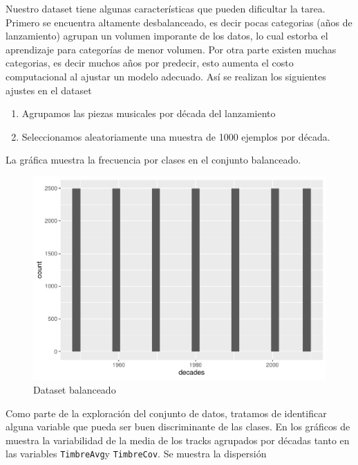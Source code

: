 \documentclass[conference,final,]{IEEEtran}
\providecommand{\tightlist}{%
  \setlength{\itemsep}{0pt}\setlength{\parskip}{0pt}}
\begin{document}
Nuestro dataset tiene algunas características que pueden dificultar la
tarea. Primero se encuentra altamente desbalanceado, es decir pocas
categorias (años de lanzamiento) agrupan un volumen imporante de los
datos, lo cual estorba el aprendizaje para categorías de menor volumen.
Por otra parte existen muchas categorias, es decir muchos años por
predecir, esto aumenta el costo computacional al ajustar un modelo
adecuado. Así se realizan los siguientes ajustes en el dataset

\begin{enumerate}
\def\labelenumi{\arabic{enumi}.}
\tightlist
\item
  Agrupamos las piezas musicales por década del lanzamiento
\item
  Seleccionamos aleatoriamente una muestra de 1000 ejemplos por década.
\end{enumerate}

La gráfica muestra la frecuencia por clases en el conjunto balanceado.

\begin{figure}[ht]

{\centering \includegraphics[width=0.6\linewidth]{YearPrediction_Reporte_files/figure-latex/unnamed-chunk-11-1} 

}

\caption{Dataset balanceado}\label{fig:unnamed-chunk-11}
\end{figure}

Como parte de la exploración del conjunto de datos, tratamos de
identificar alguna variable que pueda ser buen discriminante de las
clases. En los gráficos de muestra la variabilidad de la media de los
tracks agrupados por décadas tanto en las variables \texttt{TimbreAvg}y
\texttt{TimbreCov}. Se muestra la dispersión
\end{document}

